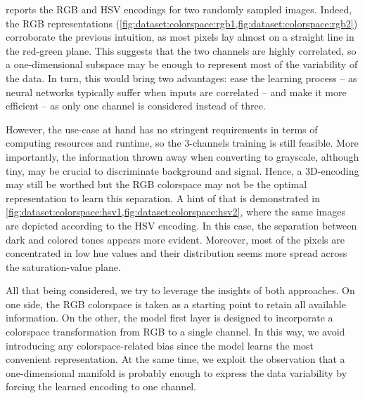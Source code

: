  reports the RGB and HSV encodings for two randomly sampled images.
Indeed, the RGB representations (\cref{fig:dataset:colorspace:rgb1,fig:dataset:colorspace:rgb2}) corroborate the previous intuition, as most pixels lay almost on a straight line in the red-green plane. 
This suggests that the two channels are highly correlated, so a one-dimensional subspace may be enough to represent most of the variability of the data.
In turn, this would bring two advantages: ease the learning process -- as neural networks typically suffer when inputs are correlated %
-- and make it more efficient -- as only one channel is considered instead of three.

However, the use-case at hand has no stringent requirements in terms of computing resources and runtime, so the 3-channels training is still feasible.
More importantly, the information thrown away when converting to grayscale, although tiny, may be crucial to discriminate background and signal. 
Hence, a 3D-encoding may still be worthed but the RGB colorspace may not be the optimal representation to learn this separation. A hint of that is demonstrated in \cref{fig:dataset:colorspace:hsv1,fig:dataset:colorspace:hsv2}, where the same images are depicted according to the HSV encoding. 
In this case, the separation between dark and colored tones appears more evident. 
Moreover, most of the pixels are concentrated in low hue values
and their distribution seems more spread across the saturation-value plane. 

All that being considered, we try to leverage the insights of both approaches. 
On one side, the RGB colorspace is taken as a starting point to retain all available information. On the other, the model first layer is designed to incorporate a colorspace transformation from RGB to a single channel.
In this way, we avoid introducing any colorspace-related bias since the model learns the most convenient representation.
At the same time, we exploit the observation that a one-dimensional manifold is probably enough to express the data variability by forcing the learned encoding to one channel.
    
